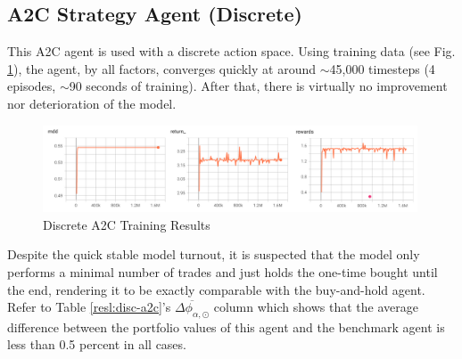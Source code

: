 \subsection{A2C Strategy Agent (Discrete)}
This A2C agent is used with a discrete action space. Using training data (see Fig. \ref{gr:a2cd:train}), the agent, by all factors, converges quickly at around $\sim$45,000 timesteps (4 episodes, $\sim$90 seconds of training). After that, there is virtually no improvement nor deterioration of the model.

\begin{figure}[H]
    \centering
    \includegraphics[width=0.99\textwidth]{graphics/trainphoto/a2cd-train.png}
    \caption{Discrete A2C Training Results}
    \label{gr:a2cd:train}
\end{figure}

Despite the quick stable model turnout, it is suspected that the model only performs a minimal number of trades and just holds the one-time bought until the end, rendering it to be exactly comparable with the buy-and-hold agent. Refer to Table \ref{resl:disc-a2c}'s $\overline{\Delta\phi_{\alpha,\odot}}$ column which shows that the average difference between the portfolio values of this agent and the benchmark agent is less than 0.5 percent in all cases.

